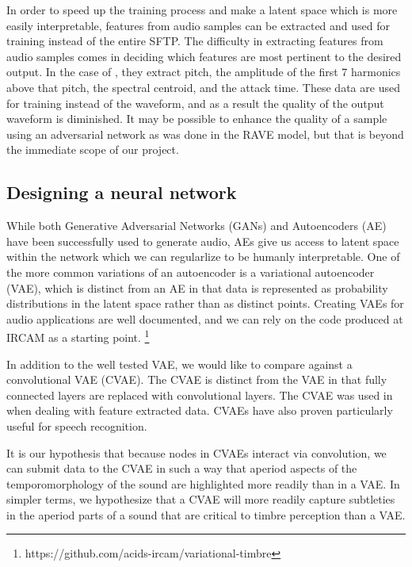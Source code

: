 \documentclass{article}
\begin{document}
In order to speed up the training process and make a latent space which is more easily interpretable, features from audio samples can be extracted and used for training instead of the entire SFTP. \cite{Natsiou2023} The difficulty in extracting features from audio samples comes in deciding which features are most pertinent to the desired output. In the case of \cite{Natsiou2023}, they extract pitch, the amplitude of the first 7 harmonics above that pitch, the spectral centroid, and the attack time. These data are used for training instead of the waveform, and as a result the quality of the output waveform is diminished. It may be possible to enhance the quality of a sample using an adversarial network as was done in the RAVE model, but that is beyond the immediate scope of our project. \cite{Caillon2021}

\subsection{Designing a neural network}

While both Generative Adversarial Networks (GANs) and Autoencoders (AE) have been successfully used to generate audio, AEs give us access to latent space within the network which we can regularlize to be humanly interpretable. One of the more common variations of an autoencoder is a variational autoencoder (VAE), which is distinct from an AE in that data is represented as probability distributions in the latent space rather than as distinct points. Creating VAEs for audio applications are well documented, and we can rely on the code produced at IRCAM as a starting point. \cite{Esling2018}\footnote{https://github.com/acids-ircam/variational-timbre}

In addition to the well tested VAE, we would like to compare against a convolutional VAE (CVAE). The CVAE is distinct from the VAE in that fully connected layers are replaced with convolutional layers. The CVAE was used in \cite{Natsiou2023} when dealing with feature extracted data. CVAEs have also proven particularly useful for speech recognition. \cite{Iakovenko2020}

It is our hypothesis that because nodes in CVAEs interact via convolution, we can submit data to the CVAE in such a way that aperiod aspects of the temporomorphology of the sound are highlighted more readily than in a VAE. In simpler terms, we hypothesize that a CVAE will more readily capture subtleties in the aperiod parts of a sound that are critical to timbre perception than a VAE.
\end{document}
